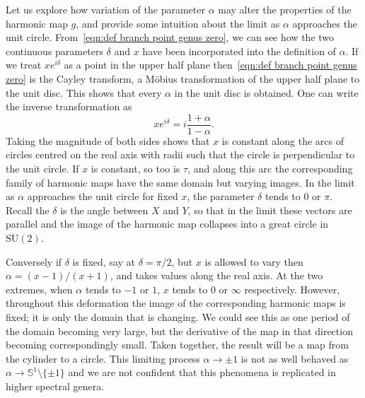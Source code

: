 \documentclass{article}
\numberwithin{equation}{section}
\numberwithin{figure}{section}
\newcommand{\iu}{i}
\renewcommand{\S}{\mathbb{S}}
\newcommand{\SU}{\mathrm{SU}}
\begin{document}
Let us explore how variation of the parameter $\alpha$ may alter the properties of the harmonic map $g$, and provide some intuition about the limit as $\alpha$ approaches the unit circle. From~\eqref{eqn:def branch point genus zero}, we can see how the two continuous parameters $\delta$ and $x$ have been incorporated into the definition of $\alpha$. If we treat $xe^{\iu \delta}$ as a point in the upper half plane then~\eqref{eqn:def branch point genus zero} is the Cayley transform, a M\"obius transformation of the upper half plane to the unit disc. This shows that every $\alpha$ in the unit disc is obtained. 
One can write the inverse transformation as
\[
x e^{\iu \delta} = \iu \frac{1+\alpha}{1-\alpha}.
\]
Taking the magnitude of both sides shows that $x$ is constant along the arcs of circles centred on the real axis with radii such that the circle is perpendicular to the unit circle. 
If $x$ is constant, so too is $\tau$, and along this arc the corresponding family of harmonic maps have the same domain but varying images.
In the limit as $\alpha$ approaches the unit circle for fixed $x$, the parameter $\delta$ tends to $0$ or $\pi$. Recall the $\delta$ is the angle between $X$ and $Y$, so that in the limit these vectors are parallel and the image of the harmonic map collapses into a great circle in $\SU(2)$.

Conversely if $\delta$ is fixed, say at $\delta=\pi/2$, but $x$ is allowed to vary then $\alpha = (x-1)/(x+1)$,
and takes values along the real axis. At the two extremes, when $\alpha$ tends to $-1$ or $1$, $x$ tends to $0$ or $\infty$ respectively. 
However, throughout this deformation the image of the corresponding harmonic maps is fixed; it is only the domain that is changing. We could see this as one period of the domain becoming very large, but the derivative of the map in that direction becoming correspondingly small. Taken together, the result will be a map from the cylinder to a circle. This limiting process $\alpha \to \pm 1$ is not as well behaved as $\alpha \to \S^1\setminus\{\pm 1\}$ and we are not confident that this phenomena is replicated in higher spectral genera.
\end{document}
